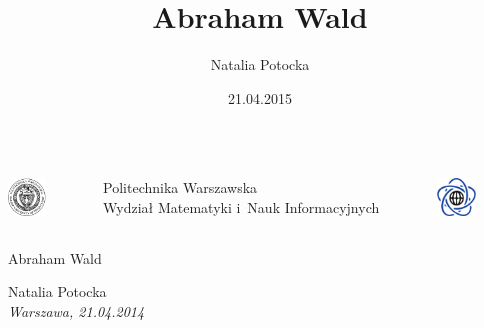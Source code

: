 \documentclass[11pt,pdftex,mathserif]{beamer}\usepackage[]{graphicx}\usepackage[]{color}
\title[Abraham Wald]{Abraham Wald}
\author[N. Potocka]{Natalia Potocka}
\date[21.04.2015]{21.04.2015}
\theoremstyle{definition}
\begin{document}
\thispagestyle{empty}%
\begin{frame}%

   \begin{center}%
%
%
%
      \begin{columns}%
         \begin{column}[c]{1.2cm}\centering%
         \includegraphics[height=1.0cm]{logopw.pdf} \\%
         \end{column}

         \begin{column}[c]{7cm}\centering
            {\footnotesize{Politechnika Warszawska}}\\%
            {\footnotesize{Wydział Matematyki i~Nauk Informacyjnych}}%
         \end{column}

         \begin{column}[c]{1.2cm}\centering%
         \includegraphics[height=1.0cm]{logomini.pdf} \\%
         \end{column}%
      \end{columns}


      \vspace*{2em}

      \colorbox{green2}{\parbox{10cm}{\color{black}\centering\LARGE{Abraham Wald}}}

      \vspace*{1.5em}%
      {\Large{Natalia Potocka}}\\%

      {\it\footnotesize Warszawa, 21.04.2014}  %

   \end{center}

\end{frame}
\end{document}
